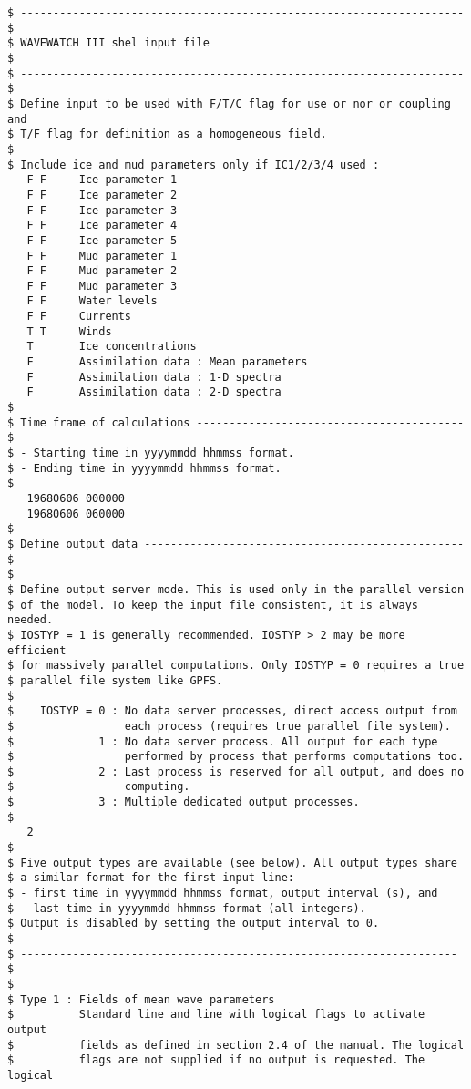 \begin{footnotesize}
\begin{verbatim}
$ -------------------------------------------------------------------- $
$ WAVEWATCH III shel input file                                        $
$ -------------------------------------------------------------------- $
$ Define input to be used with F/T/C flag for use or nor or coupling and
$ T/F flag for definition as a homogeneous field.
$
$ Include ice and mud parameters only if IC1/2/3/4 used :
   F F     Ice parameter 1
   F F     Ice parameter 2
   F F     Ice parameter 3
   F F     Ice parameter 4
   F F     Ice parameter 5
   F F     Mud parameter 1
   F F     Mud parameter 2
   F F     Mud parameter 3
   F F     Water levels
   F F     Currents
   T T     Winds
   T       Ice concentrations
   F       Assimilation data : Mean parameters
   F       Assimilation data : 1-D spectra
   F       Assimilation data : 2-D spectra
$
$ Time frame of calculations ----------------------------------------- $
$ - Starting time in yyyymmdd hhmmss format.
$ - Ending time in yyyymmdd hhmmss format.
$
   19680606 000000
   19680606 060000
$
$ Define output data ------------------------------------------------- $
$
$ Define output server mode. This is used only in the parallel version
$ of the model. To keep the input file consistent, it is always needed.
$ IOSTYP = 1 is generally recommended. IOSTYP > 2 may be more efficient
$ for massively parallel computations. Only IOSTYP = 0 requires a true
$ parallel file system like GPFS.
$
$    IOSTYP = 0 : No data server processes, direct access output from
$                 each process (requires true parallel file system).
$             1 : No data server process. All output for each type 
$                 performed by process that performs computations too.
$             2 : Last process is reserved for all output, and does no
$                 computing.
$             3 : Multiple dedicated output processes.
$
   2
$
$ Five output types are available (see below). All output types share
$ a similar format for the first input line:
$ - first time in yyyymmdd hhmmss format, output interval (s), and 
$   last time in yyyymmdd hhmmss format (all integers).
$ Output is disabled by setting the output interval to 0.
$
$ ------------------------------------------------------------------- $
$
$ Type 1 : Fields of mean wave parameters
$          Standard line and line with logical flags to activate output
$          fields as defined in section 2.4 of the manual. The logical
$          flags are not supplied if no output is requested. The logical

\end{verbatim}
\end{footnotesize}
